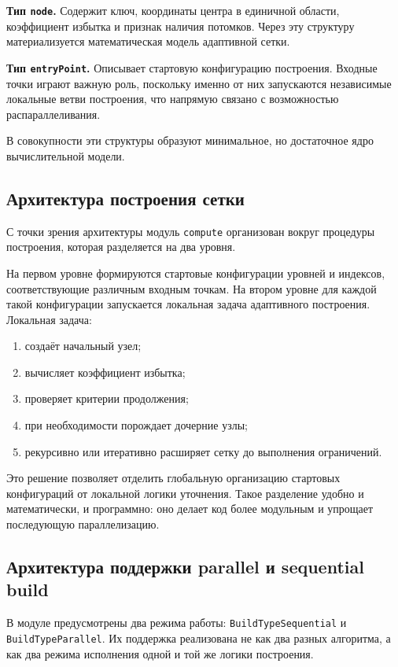 \textbf{Тип \texttt{node}.} Содержит ключ, координаты центра в единичной области, коэффициент избытка и признак наличия потомков. Через эту структуру материализуется математическая модель адаптивной сетки.

\textbf{Тип \texttt{entryPoint}.} Описывает стартовую конфигурацию построения. Входные точки играют важную роль, поскольку именно от них запускаются независимые локальные ветви построения, что напрямую связано с возможностью распараллеливания.

В совокупности эти структуры образуют минимальное, но достаточное ядро вычислительной модели.

\subsection{Архитектура построения сетки}

С точки зрения архитектуры модуль \texttt{compute} организован вокруг процедуры построения, которая разделяется на два уровня.

На первом уровне формируются стартовые конфигурации уровней и индексов, соответствующие различным входным точкам. На втором уровне для каждой такой конфигурации запускается локальная задача адаптивного построения. Локальная задача:
\begin{enumerate}
    \item создаёт начальный узел;
    \item вычисляет коэффициент избытка;
    \item проверяет критерии продолжения;
    \item при необходимости порождает дочерние узлы;
    \item рекурсивно или итеративно расширяет сетку до выполнения ограничений.
\end{enumerate}

Это решение позволяет отделить глобальную организацию стартовых конфигураций от локальной логики уточнения. Такое разделение удобно и математически, и программно: оно делает код более модульным и упрощает последующую параллелизацию.

\subsection{Архитектура поддержки parallel и sequential build}

В модуле предусмотрены два режима работы: \texttt{BuildTypeSequential} и \texttt{BuildTypeParallel}. Их поддержка реализована не как два разных алгоритма, а как два режима исполнения одной и той же логики построения.

